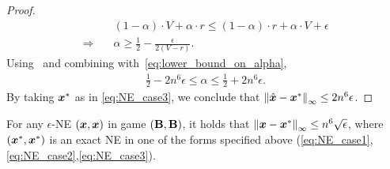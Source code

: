 \begin{proof}
\begin{align}
        & (1 - \alpha) \cdot V + \alpha \cdot r \leq (1 - \alpha) \cdot r + \alpha \cdot V + \epsilon \label{eq:alpha_upper_lower_bound}\\
        \Rightarrow \quad &  \alpha \geq \frac{1}{2} - \frac{\epsilon}{2(V - r)}. \label{eq:range_alpha}
    \end{align}
    Using~ and 
    combining with~\eqref{eq:lower_bound_on_alpha},
    \begin{align*}
        \frac{1}{2} - 2n^6\epsilon \leq \alpha \leq \frac{1}{2} + 2n^6\epsilon.
    \end{align*}
    By taking ${\bm{x}}^*$ as in \eqref{eq:NE_case3}, we conclude that $\left\| \hat{{\bm{x}}} - {\bm{x}}^* \right\|_{\infty} \leq 2n^6 \epsilon$.
\end{proof}

\begin{theorem}\label{thm:betadefined}
    For any $\epsilon$-NE $({\bm{x}}, {\bm{x}})$ in game $(\mathbf{B}, \mathbf{B})$, it holds that $\left\| {\bm{x}} - {\bm{x}}^* \right\|_{\infty} \leq n^6 \sqrt{\epsilon}$, where $({\bm{x}}^*, {\bm{x}}^*)$ is an exact NE in one of the forms specified above (\ref{eq:NE_case1},\ref{eq:NE_case2},\ref{eq:NE_case3}).
\end{theorem}

